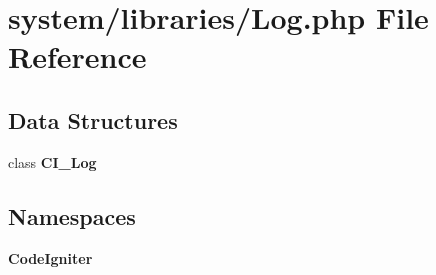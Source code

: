\section{system/libraries/\-Log.php File Reference}
\label{_log_8php}
\subsection*{Data Structures}
\begin{DoxyCompactItemize}
\item 
class {\bf C\-I\-\_\-\-Log}
\end{DoxyCompactItemize}
\subsection*{Namespaces}
\begin{DoxyCompactItemize}
\item 
{\bf Code\-Igniter}
\end{DoxyCompactItemize}
